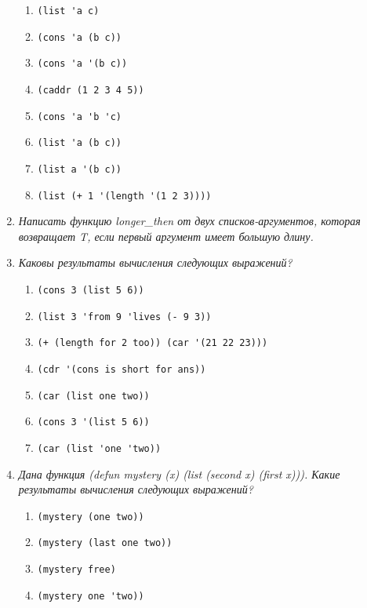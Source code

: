 \begin{enumerate}[wide=0pt]
\begin{enumerate}[label=\arabic*)]
	\item \lstinline {(list 'a c)}
	\item \lstinline {(cons 'a (b c))}
	\item \lstinline {(cons 'a '(b c))}
	\item \lstinline {(caddr (1 2 3 4 5))}
	\item \lstinline {(cons 'a 'b 'c)}
	\item \lstinline {(list 'a (b c))}
	\item \lstinline {(list a '(b c))}
	\item \lstinline {(list (+ 1 '(length '(1 2 3))))}
	
\end{enumerate}

\item \textit{Написать функцию longer\_then от двух списков-аргументов, 
которая возвращает T, если первый аргумент имеет большую длину.}



\item \textit{Каковы результаты вычисления следующих выражений?}

\begin{enumerate}[label=\arabic*)]
	\item \lstinline {(cons 3 (list 5 6))}
	\item \lstinline {(list 3 'from 9 'lives (- 9 3))}
	\item \lstinline {(+ (length for 2 too)) (car '(21 22 23)))}
	\item \lstinline {(cdr '(cons is short for ans))}
	\item \lstinline {(car (list one two))}
	\item \lstinline {(cons 3 '(list 5 6))}
	\item \lstinline {(car (list 'one 'two))}

	
\end{enumerate}

\item \textit{Дана функция (defun mystery (x) (list (second x) (first x))).
Какие результаты вычисления следующих выражений? }


\begin{enumerate}[label=\arabic*)]
	\item \lstinline {(mystery (one two))}
	\item \lstinline {(mystery (last one two))}
	\item \lstinline {(mystery free)}
	\item \lstinline {(mystery one 'two))}


\end{enumerate}
\end{enumerate}
